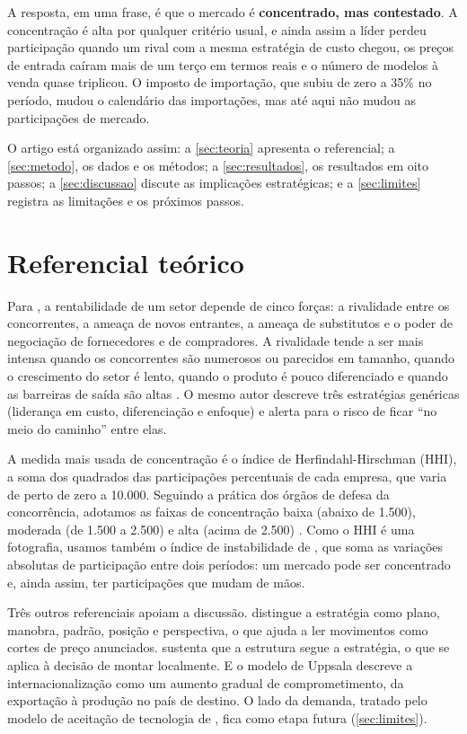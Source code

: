 \documentclass[article,11pt,oneside,a4paper,english,brazil,sumario=tradicional]{abntex2}
\begin{document}
A resposta, em uma frase, é que o mercado é \textbf{concentrado, mas contestado}. A concentração é alta por qualquer critério usual, e ainda assim a líder perdeu participação quando um rival com a mesma estratégia de custo chegou, os preços de entrada caíram mais de um terço em termos reais e o número de modelos à venda quase triplicou. O imposto de importação, que subiu de zero a 35\% no período, mudou o calendário das importações, mas até aqui não mudou as participações de mercado.

O artigo está organizado assim: a \autoref{sec:teoria} apresenta o referencial; a \autoref{sec:metodo}, os dados e os métodos; a \autoref{sec:resultados}, os resultados em oito passos; a \autoref{sec:discussao} discute as implicações estratégicas; e a \autoref{sec:limites} registra as limitações e os próximos passos.

\section{Referencial teórico}\label{sec:teoria}

Para , a rentabilidade de um setor depende de cinco forças: a rivalidade entre os concorrentes, a ameaça de novos entrantes, a ameaça de substitutos e o poder de negociação de fornecedores e de compradores. A rivalidade tende a ser mais intensa quando os concorrentes são numerosos ou parecidos em tamanho, quando o crescimento do setor é lento, quando o produto é pouco diferenciado e quando as barreiras de saída são altas \cite{porter1980}. O mesmo autor descreve três estratégias genéricas (liderança em custo, diferenciação e enfoque) e alerta para o risco de ficar ``no meio do caminho'' entre elas.

A medida mais usada de concentração é o índice de Herfindahl-Hirschman (HHI), a soma dos quadrados das participações percentuais de cada empresa, que varia de perto de zero a 10.000. Seguindo a prática dos órgãos de defesa da concorrência, adotamos as faixas de concentração baixa (abaixo de 1.500), moderada (de 1.500 a 2.500) e alta (acima de 2.500) \cite{cade2016}. Como o HHI é uma fotografia, usamos também o índice de instabilidade de , que soma as variações absolutas de participação entre dois períodos: um mercado pode ser concentrado e, ainda assim, ter participações que mudam de mãos.

Três outros referenciais apoiam a discussão.  distingue a estratégia como plano, manobra, padrão, posição e perspectiva, o que ajuda a ler movimentos como cortes de preço anunciados.  sustenta que a estrutura segue a estratégia, o que se aplica à decisão de montar localmente. E o modelo de Uppsala \cite{johanson1977} descreve a internacionalização como um aumento gradual de comprometimento, da exportação à produção no país de destino. O lado da demanda, tratado pelo modelo de aceitação de tecnologia de , fica como etapa futura (\autoref{sec:limites}).
\end{document}
